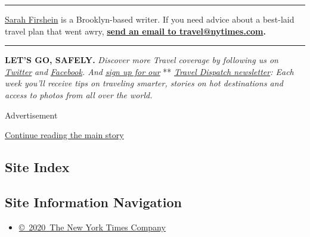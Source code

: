 \begin{center}\rule{0.5\linewidth}{\linethickness}\end{center}

\href{https://twitter.com/sfirshein?lang=en}{Sarah Firshein} is a
Brooklyn-based writer. If you need advice about a best-laid travel plan
that went awry, \textbf{\href{mailto:travel@nytimes.com}{send an email
to travel@nytimes.com}.}

\begin{center}\rule{0.5\linewidth}{\linethickness}\end{center}

\textbf{LET'S GO, SAFELY.} \emph{Discover more Travel coverage by
following us on}
\href{https://twitter.com/nytimestravel}{\emph{Twitter}} \emph{and}
\href{https://www.facebook.com/nytimestravel/}{\emph{Facebook}}\emph{.
And}
\href{https://www.nytimes.com/newsletters/traveldispatch?action=click\&module=inline\&pgtype=Article}{\emph{sign
up for our}} **
\href{https://www.nytimes.com/newsletters/traveldispatch}{\emph{Travel
Dispatch newsletter}}\emph{: Each week you'll receive tips on traveling
smarter, stories on hot destinations and access to photos from all over
the world.}

Advertisement

\protect\hyperlink{after-bottom}{Continue reading the main story}

\hypertarget{site-index}{%
\subsection{Site Index}\label{site-index}}

\hypertarget{site-information-navigation}{%
\subsection{Site Information
Navigation}\label{site-information-navigation}}

\begin{itemize}
\tightlist
\item
  \href{https://help.nytimes.com/hc/en-us/articles/115014792127-Copyright-notice}{©~2020~The
  New York Times Company}
\end{itemize}

